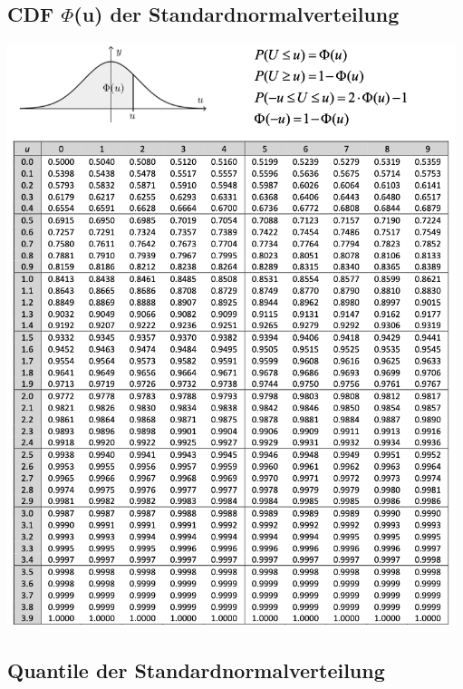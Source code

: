\documentclass[8pt,a4paper]{scrartcl}
\begin{document}
\pagebreak

\begin{multicols*}{2}


	\subsection{CDF $\Phi$(u) der Standardnormalverteilung}

		\includegraphics[height=17cm]{img/Standardnormalverteilung.png}

	\subsection{Quantile der Standardnormalverteilung}


\end{multicols*}
\end{document}
